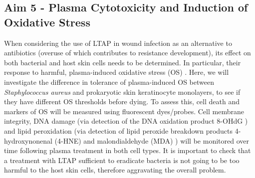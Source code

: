 \documentclass[11pt, oneside]{article}   	%
\begin{document}

\subsection*{Aim 5 - Plasma Cytotoxicity and Induction of Oxidative Stress}

When considering the use of LTAP in wound infection as an alternative to antibiotics (overuse of which contributes to resistance development), its effect on both bacterial and host skin cells needs to be determined. In particular, their response to harmful, plasma-induced oxidative stress (OS) \cite{Valko2007free}.
Here, we will investigate the difference in tolerance of plasma-induced OS between \textit{Staphylococcus aureus} and prokaryotic skin keratinocyte monolayers, to see if they have different OS thresholds before dying.
To assess this, cell death and markers of OS will be measured using fluorescent dyes/probes.
Cell membrane integrity, DNA damage (via detection of the DNA oxidation product 8-OHdG \cite{Valavanidis20098, Dizdaroglu2012oxidatively}) and lipid peroxidation (via detection of lipid peroxide breakdown products 4-hydroxynonenal (4-HNE) and malondialdehyde (MDA) \cite{Ayala2014lipid, Joshi2010control, Joshi2011nonthermal}) will be monitored over time following plasma treatment in both cell types.
It is important to check that a treatment with LTAP sufficient to eradicate bacteria is not going to be too harmful to the host skin cells, therefore aggravating the overall problem.
\end{document}
